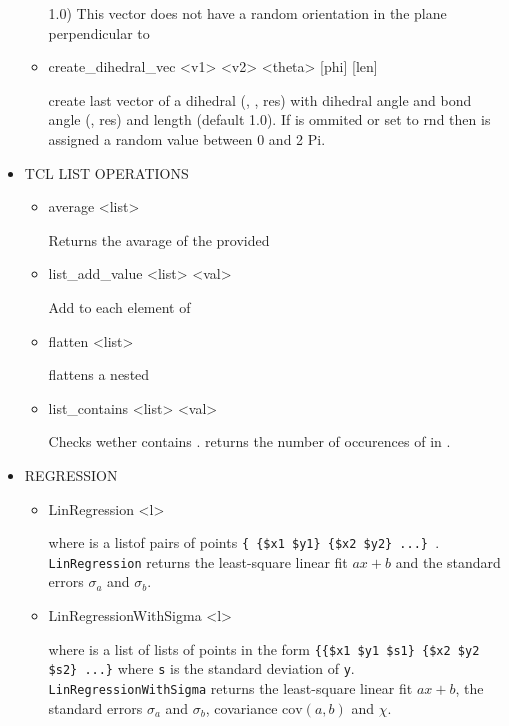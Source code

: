 \begin{itemize}
\begin{itemize}
1.0) This vector does not have a random orientation in the plane
perpendicular to 
   \item
\begin{code}
create\_dihedral\_vec <v1> <v2> <theta> [phi] [len]
\end{code}
create last vector of a dihedral (, , res) with
dihedral angle  and bond angle (, res) 
and length  (default 1.0). If  is ommited or set to
rnd then  is assigned a random value between 0 and 2 Pi.
  \end{itemize}
 \item
  TCL LIST OPERATIONS
  \begin{itemize}
   \item
\begin{code}
average <list>
\end{code}
    Returns the avarage of the provided 
   \item
\begin{code}
list\_add\_value <list> <val>
\end{code}
    Add  to each element of 
   \item
\begin{code}
flatten <list>
\end{code}
    flattens a nested 
   \item
\begin{code}
list\_contains <list> <val>
\end{code}
Checks wether  contains . returns the number of
occurences of  in .
  \end{itemize}
 \item
  REGRESSION
  \begin{itemize}
   \item
\begin{code}
LinRegression <l>
\end{code}
where  is a listof pairs of points \verb!{ {$x1 $y1} {$x2 $y2} ...} !. 
\verb!LinRegression! returns the least-square linear fit $ax+b$ and 
the standard errors $\sigma_a$ and $\sigma_b$.
   \item
\begin{code}
LinRegressionWithSigma <l>
\end{code}
where  is a list of lists of points in the form \verb!{{$x1 $y1 $s1} {$x2 $y2 $s2} ...}! 
where \verb!s! is the standard deviation of \verb!y!. 
\verb!LinRegressionWithSigma! returns the least-square linear fit 
$ax+b$, the standard errors $\sigma_a$ and $\sigma_b$, 
covariance $\mathrm{cov}(a,b)$ and $\chi$.
\end{itemize}
\end{itemize}

